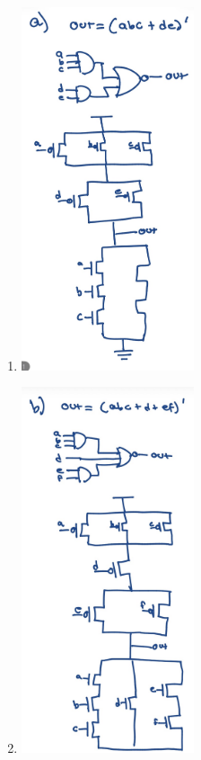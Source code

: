 \documentclass[11pt]{article}
\begin{document}
\begin{enumerate}[label={\bfseries\alph*)}, itemsep=1em]
    \item 
    \begin{center}
        \includegraphics[width=0.4\textwidth]{question2/2a.jpeg}
    \end{center}

    \item 
    \begin{center}
        \includegraphics[width=0.4\textwidth]{question2/2b.jpeg}
    \end{center}


\end{enumerate}
\end{document}
